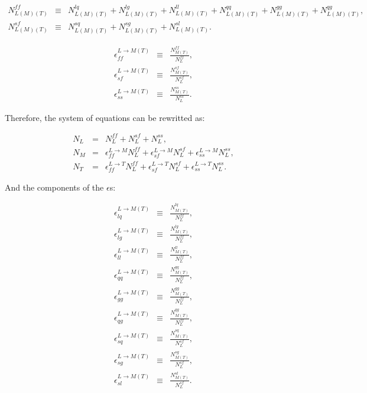\begin{eqnarray}
N_{L(M)(T)}^{ff} & \equiv & N_{L(M)(T)}^{lq} + N_{L(M)(T)}^{lg} + N_{L(M)(T)}^{ll} + N_{L(M)(T)}^{qq} + N_{L(M)(T)}^{gg} + N_{L(M)(T)}^{qg}, \label{eq:N1_}\\
N_{L(M)(T)}^{sf} & \equiv & N_{L(M)(T)}^{sq} + N_{L(M)(T)}^{sg} + N_{L(M)(T)}^{sl}. \label{eq:N2_}
\end{eqnarray}

\begin{eqnarray}
\epsilon_{ff}^{L \rightarrow M(T)} & \equiv & \frac{N_{M(T)}^{ff}}{N_{L}^{ff}}, \label{eq:eps1_}\\
\epsilon_{sf}^{L \rightarrow M(T)} & \equiv & \frac{N_{M(T)}^{sf}}{N_{L}^{sf}}, \label{eq:eps2_}\\
\epsilon_{ss}^{L \rightarrow M(T)} & \equiv & \frac{N_{M(T)}^{ss}}{N_{L}^{ss}}. \label{eq:eps3_}
\end{eqnarray}

Therefore, the system of equations can be rewritted as:

\begin{eqnarray}
N_{L} & = & N_{L}^{ff} + N_{L}^{sf} + N_{L}^{ss}, \label{eq:mm4_}\\
N_{M} & = & \epsilon_{ff}^{L \rightarrow M} N_{L}^{ff} + \epsilon_{sf}^{L \rightarrow M} N_{L}^{sf} + \epsilon_{ss}^{L \rightarrow M} N_{L}^{ss}, \label{eq:mm5_}\\
N_{T} & = & \epsilon_{ff}^{L \rightarrow T} N_{L}^{ff} + \epsilon_{sf}^{L \rightarrow T} N_{L}^{sf} + \epsilon_{ss}^{L \rightarrow T} N_{L}^{ss}. \label{eq:mm6_}
\end{eqnarray}

And the components of the $\epsilon$s:

\begin{eqnarray}
\epsilon_{lq}^{L \rightarrow M(T)} & \equiv & \frac{N_{M(T)}^{lq}}{N_{L}^{ff}}, \label{eq:eps4_}\\
\epsilon_{lg}^{L \rightarrow M(T)} & \equiv & \frac{N_{M(T)}^{lg}}{N_{L}^{ff}}, \label{eq:eps4__}\\
\epsilon_{ll}^{L \rightarrow M(T)} & \equiv & \frac{N_{M(T)}^{ll}}{N_{L}^{ff}}, \label{eq:eps5_}\\
\epsilon_{qq}^{L \rightarrow M(T)} & \equiv & \frac{N_{M(T)}^{qq}}{N_{L}^{ff}}, \label{eq:eps6__}\\
\epsilon_{gg}^{L \rightarrow M(T)} & \equiv & \frac{N_{M(T)}^{gg}}{N_{L}^{ff}}, \label{eq:eps6___}\\
\epsilon_{qg}^{L \rightarrow M(T)} & \equiv & \frac{N_{M(T)}^{qg}}{N_{L}^{ff}}, \label{eq:eps6____}\\
\epsilon_{sq}^{L \rightarrow M(T)} & \equiv & \frac{N_{M(T)}^{sq}}{N_{L}^{sf}}, \label{eq:eps7}\\
\epsilon_{sg}^{L \rightarrow M(T)} & \equiv & \frac{N_{M(T)}^{sg}}{N_{L}^{sf}}, \label{eq:eps8}\\
\epsilon_{sl}^{L \rightarrow M(T)} & \equiv & \frac{N_{M(T)}^{sl}}{N_{L}^{sf}}. \label{eq:eps8_}
\end{eqnarray}


